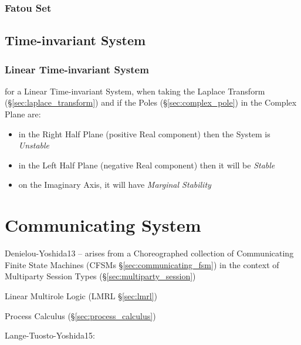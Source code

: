 \subsubsection{Fatou Set}\label{sec:fatou_set}



\subsection{Time-invariant System}\label{sec:time_invariant_system}

\subsubsection{Linear Time-invariant System}\label{sec:lti}

for a Linear Time-invariant System, when taking the Laplace Transform
(\S\ref{sec:laplace_transform}) and if the Poles (\S\ref{sec:complex_pole}) in
the Complex Plane are:
\begin{itemize}
  \item in the Right Half Plane (positive Real component) then the System is
    \emph{Unstable}
  \item in the Left Half Plane (negative Real component) then it will be
    \emph{Stable}
  \item on the Imaginary Axis, it will have \emph{Marginal Stability}
\end{itemize}



\section{Communicating System}\label{sec:communicating_system}

Denielou-Yoshida13 -- arises from a Choreographed collection of
Communicating Finite State Machines (CFSMs
\S\ref{sec:communicating_fsm}) in the context of Multiparty Session
Types (\S\ref{sec:multiparty_session})

Linear Multirole Logic (LMRL \S\ref{sec:lmrl})

\fist Process Calculus (\S\ref{sec:process_calculus})

Lange-Tuosto-Yoshida15:

